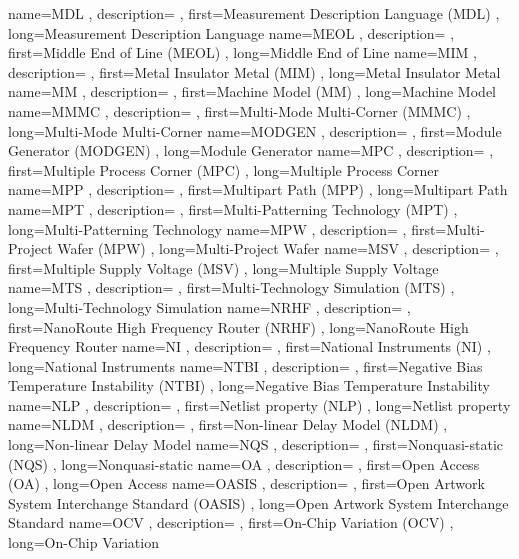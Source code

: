 { name={MDL}
, description={}
, first={Measurement Description Language (MDL)}
, long={Measurement Description Language}
}
{ name={MEOL}
, description={}
, first={Middle End of Line (MEOL)}
, long={Middle End of Line}
}
{ name={MIM}
, description={}
, first={Metal Insulator Metal (MIM)}
, long={Metal Insulator Metal}
}
{ name={MM}
, description={}
, first={Machine Model (MM)}
, long={Machine Model}
}
{ name={MMMC}
, description={}
, first={Multi-Mode Multi-Corner (MMMC)}
, long={Multi-Mode Multi-Corner}
}
{ name={MODGEN}
, description={}
, first={Module Generator (MODGEN)}
, long={Module Generator}
}
{ name={MPC}
, description={}
, first={Multiple Process Corner (MPC)}
, long={Multiple Process Corner}
}
{ name={MPP}
, description={}
, first={Multipart Path (MPP)}
, long={Multipart Path}
}
{ name={MPT}
, description={}
, first={Multi-Patterning Technology (MPT)}
, long={Multi-Patterning Technology}
}
{ name={MPW}
, description={}
, first={Multi-Project Wafer (MPW)}
, long={Multi-Project Wafer}
}
{ name={MSV}
, description={}
, first={Multiple Supply Voltage (MSV)}
, long={Multiple Supply Voltage}
}
{ name={MTS}
, description={}
, first={Multi-Technology Simulation (MTS)}
, long={Multi-Technology Simulation}
}
{ name={NRHF}
, description={}
, first={NanoRoute High Frequency Router (NRHF)}
, long={NanoRoute High Frequency Router}
}
{ name={NI}
, description={}
, first={National Instruments (NI)}
, long={National Instruments}
}
{ name={NTBI}
, description={}
, first={Negative Bias Temperature Instability (NTBI)}
, long={Negative Bias Temperature Instability}
}
{ name={NLP}
, description={}
, first={Netlist property (NLP)}
, long={Netlist property}
}
{ name={NLDM}
, description={}
, first={Non-linear Delay Model (NLDM)}
, long={Non-linear Delay Model}
}
{ name={NQS}
, description={}
, first={Nonquasi-static (NQS)}
, long={Nonquasi-static}
}
{ name={OA}
, description={}
, first={Open Access (OA)}
, long={Open Access}
}
{ name={OASIS}
, description={}
, first={Open Artwork System Interchange Standard (OASIS)}
, long={Open Artwork System Interchange Standard}
}
{ name={OCV}
, description={}
, first={On-Chip Variation (OCV)}
, long={On-Chip Variation}
}
